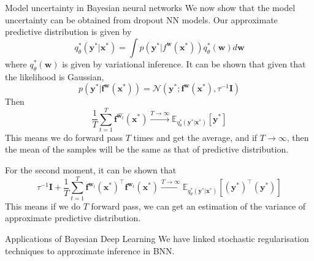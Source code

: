 \documentclass{beamer}
\begin{document}
\begin{frame}[allowframebreaks]{Model uncertainty in Bayesian neural networks}
We now show that the model uncertainty can be obtained from dropout NN models. Our approximate predictive distribution is given by 
$$q_\theta^\ast(\mathbf{y}^\ast | \mathbf{x}^\ast) = \int p(\mathbf{y}^\ast | f^{\mathbf{w}}(\mathbf{x}^\ast)) q_\theta^\ast (\mathbf{w}) d\mathbf{w}$$
where $q_\theta^\ast (\mathbf{w})$ is given by variational inference. It can be shown that given that the likelihood is Gaussian, 
$$p(\mathbf{y}^\ast | \mathbf{f}^{\mathbf{w}}(\mathbf{x}^\ast)) = \mathcal{N} (\mathbf{y}^\ast ; \mathbf{f}^\mathbf{w}(\mathbf{x}^\ast), \tau^{-1} \mathbf{I})$$
Then 
$$\frac{1}{T} \sum_{t = 1}^T \mathbf{f}^{\hat{\mathbf{w}_t}}(\mathbf{x}^\ast) 
\xrightarrow{T \rightarrow \infty} \mathbb{E}_{q_\theta^\ast(\mathbf{y}^\ast | \mathbf{x}^\ast)}[\mathbf{y}^\ast]$$
This means we do forward pass $T$ times and get the average, and if $T \rightarrow \infty$, then the mean of the samples will be the same as that of predictive distribution.

\framebreak 

For the second moment, it can be shown that 
$$\tau^{-1}\mathbf{I} + \frac{1}{T} \sum_{t = 1}^T \mathbf{f}^{\hat{\mathbf{w}_t}}(\mathbf{x}^\ast)^\top  \mathbf{f}^{\hat{\mathbf{w}_t}}(\mathbf{x}^\ast) \xrightarrow{T \rightarrow \infty} \mathbb{E}_{q_\theta^\ast(\mathbf{y}^\ast | \mathbf{x}^\ast)}[(\mathbf{y}^\ast)^\top (\mathbf{y}^\ast) ]$$
This means if we do $T$ forward pass, we can get an estimation of the variance of approximate predictive distribution.
\end{frame}

\begin{frame}[allowframebreaks]{Applications of Bayesian Deep Learning}
We have linked stochastic regularisation techniques to approximate inference in BNN.    

\end{frame}
\end{document}
